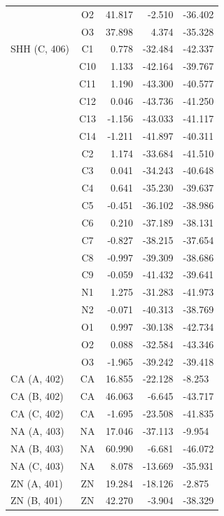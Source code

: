 \begin{longtable}{@{}lcrr@{}}
   & O2 & 41.817 & -2.510 & -36.402 \\
   & O3 & 37.898 & 4.374 & -35.328 \\
  \cmidrule(r){1-5}
  SHH (C, 406) & C1 & 0.778 & -32.484 & -42.337 \\
   & C10 & 1.133 & -42.164 & -39.767 \\
   & C11 & 1.190 & -43.300 & -40.577 \\
   & C12 & 0.046 & -43.736 & -41.250 \\
   & C13 & -1.156 & -43.033 & -41.117 \\
   & C14 & -1.211 & -41.897 & -40.311 \\
   & C2 & 1.174 & -33.684 & -41.510 \\
   & C3 & 0.041 & -34.243 & -40.648 \\
   & C4 & 0.641 & -35.230 & -39.637 \\
   & C5 & -0.451 & -36.102 & -38.986 \\
   & C6 & 0.210 & -37.189 & -38.131 \\
   & C7 & -0.827 & -38.215 & -37.654 \\
   & C8 & -0.997 & -39.309 & -38.686 \\
   & C9 & -0.059 & -41.432 & -39.641 \\
   & N1 & 1.275 & -31.283 & -41.973 \\
   & N2 & -0.071 & -40.313 & -38.769 \\
   & O1 & 0.997 & -30.138 & -42.734 \\
   & O2 & 0.088 & -32.584 & -43.346 \\
   & O3 & -1.965 & -39.242 & -39.418 \\
  \cmidrule(r){1-5}
  CA (A, 402) & CA & 16.855 & -22.128 & -8.253 \\
  \cmidrule(r){1-5}
  CA (B, 402) & CA & 46.063 & -6.645 & -43.717 \\
  \cmidrule(r){1-5}
  CA (C, 402) & CA & -1.695 & -23.508 & -41.835 \\
  \cmidrule(r){1-5}
  NA (A, 403) & NA & 17.046 & -37.113 & -9.954 \\
  \cmidrule(r){1-5}
  NA (B, 403) & NA & 60.990 & -6.681 & -46.072 \\
  \cmidrule(r){1-5}
  NA (C, 403) & NA & 8.078 & -13.669 & -35.931 \\
  \cmidrule(r){1-5}
  ZN (A, 401) & ZN & 19.284 & -18.126 & -2.875 \\
  \cmidrule(r){1-5}
  ZN (B, 401) & ZN & 42.270 & -3.904 & -38.329 \\
  \cmidrule(r){1-5}

\end{longtable}
